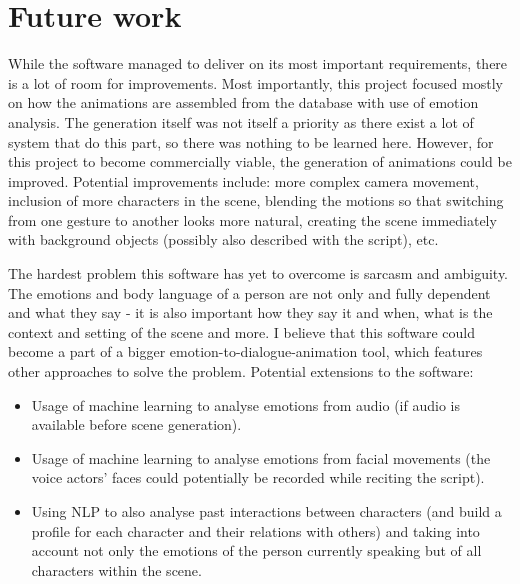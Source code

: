 \section{Future work}
While the software managed to deliver on its most important requirements, there is a lot of room for improvements. Most importantly, this project focused mostly on how the animations are assembled from the database with use of emotion analysis. The generation itself was not itself a priority as there exist a lot of system that do this part, so there was nothing to be learned here. However, for this project to become commercially viable, the generation of animations could be improved. Potential improvements include: more complex camera movement, inclusion of more characters in the scene, blending the motions so that switching from one gesture to another looks more natural, creating the scene immediately with background objects (possibly also described with the script), etc.

The hardest problem this software has yet to overcome is sarcasm and ambiguity. The emotions and body language of a person are not only and fully dependent and what they say - it is also important how they say it and when, what is the context and setting of the scene and more. I believe that this software could become a part of a bigger emotion-to-dialogue-animation tool, which features other approaches to solve the problem. Potential extensions to the software:
\begin{itemize}
	\item Usage of machine learning to analyse emotions from audio (if audio is available before scene generation).
	\item Usage of machine learning to analyse emotions from facial movements (the voice actors' faces could potentially be recorded while reciting the script).
	\item Using NLP to also analyse past interactions between characters (and build a profile for each character and their relations with others) and taking into account not only the emotions of the person currently speaking but of all characters within the scene.
\end{itemize}
